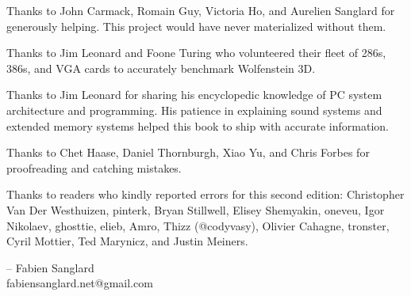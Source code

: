 Thanks to John Carmack, Romain Guy, Victoria Ho, and Aurelien Sanglard for generously helping. This project would have never
materialized without them.\\ 
\par
Thanks to  Jim Leonard and Foone Turing who volunteered their fleet of 286s, 386s, and VGA cards to accurately benchmark Wolfenstein 3D.\\
\par
Thanks to  Jim Leonard for sharing his encyclopedic knowledge of PC system architecture and programming. His patience in explaining sound systems and extended memory systems helped this book to ship with accurate information.\\
\par
Thanks to  Chet Haase, Daniel Thornburgh, Xiao Yu, and Chris Forbes for proofreading and catching mistakes.\\
\par
Thanks to readers who kindly reported errors for this second edition: Christopher Van Der Westhuizen, pinterk, Bryan Stillwell, Elisey Shemyakin, oneveu, Igor Nikolaev, ghosttie, elieb, Amro, Thizz (@codyvasy), Olivier Cahagne, tronster, Cyril Mottier, Ted Marynicz, and Justin Meiners.\\
\par
-- Fabien Sanglard\\
fabiensanglard.net@gmail.com
